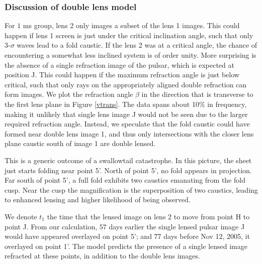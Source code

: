 \documentclass[useAMS,usenatbib]{mn2e}
\begin{document}

\subsubsection{Discussion of double lens model}
For $1$ ms group, lens 2
only images a subset of the lens 1 images.  This could happen if
lens 1 screen is just under the critical inclination
angle, such that only 3-$\sigma$ waves lead to a fold caustic.  If the lens 2 was at a critical angle, the chance of encountering a
somewhat less inclined system is of order unity.
More surprising is the absence of a single refraction
image of the pulsar, which is expected at position J.  This could
happen if the maximum refraction angle is just below critical, such
that only rays on the appropriately aligned double refraction can form
images.  
We plot the refraction angle $\beta$ in the
direction that is transverse to the first lens plane in Figure
\ref{vtrans}. The data
spans about 10\% in frequency, making it unlikely that single lens
image J would not be seen due to the larger required refraction
angle.  Instead, we speculate that the fold caustic could have formed
near double lens image 1, and thus only intersections with the closer
lens plane caustic south of image 1 are double lensed.

This is a generic outcome of a swallowtail
catastrophe\citep{Arnold1990}.   In this picture, the sheet just
starts folding near point 5'.  North of point 5', no fold appears in
projection.  Far south of point 5', a full fold exhibits two caustics
emanating from the fold cusp.  Near the cusp the magnification is the
superposition of two caustics, leading to enhanced lensing and higher
likelihood of being observed.  

We denote $t_1$ the time that the lensed image on lens 2 to move from point
H to point J. From our calculation, $57$ days earlier the
single lensed pulsar image  J would have appeared overlayed on point
5'; and $77$ days 
before Nov 12, 2005, it overlayed on point 1'. The
model predicts the presence of a single lensed image refracted at
these points, in addition to the double lens images.
\end{document}
